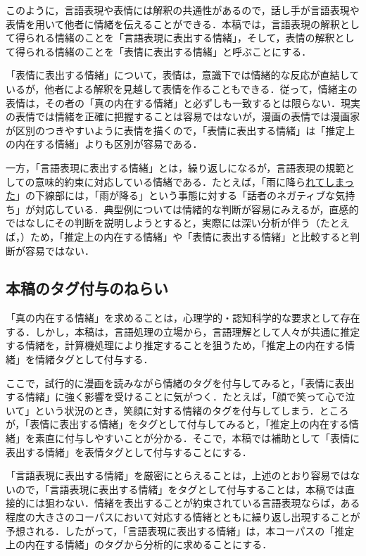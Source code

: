 \documentclass[japanese]{jnlp_1.3c}
\begin{document}
このように，言語表現や表情には解釈の共通性があるので，話し手が言語表現や表情を用いて他者に情緒を伝えることができる．本稿では，言語表現の解釈として得られる情緒のことを「言語表現に表出する情緒」，そして，表情の解釈として得られる情緒のことを「表情に表出する情緒」と呼ぶことにする．

「表情に表出する情緒」について，表情は，意識下では情緒的な反応が直結しているが，他者による解釈を見越して表情を作ることもできる．従って，情緒主の表情は，その者の「真の内在する情緒」と必ずしも一致するとは限らない．現実の表情では情緒を正確に把握することは容易ではないが，漫画の表情では漫画家が区別のつきやすいように表情を描くので，「表情に表出する情緒」は「推定上の内在する情緒」よりも区別が容易である．

一方，「言語表現に表出する情緒」とは，繰り返しになるが，言語表現の規範としての意味的約束に対応している情緒である．たとえば，「雨に降ら\underline{れてしまった}」の下線部には，「雨が降る」という事態に対する「話者のネガティブな気持ち」が対応している．典型例については情緒的な判断が容易にみえるが，直感的ではなしにその判断を説明しようとすると，実際には深い分析が伴う（たとえば，\cite{金子06}）ため，「推定上の内在する情緒」や「表情に表出する情緒」と比較すると判断が容易ではない．

\subsection{本稿のタグ付与のねらい}

「真の内在する情緒」を求めることは，心理学的・認知科学的な要求として存在する．しかし，本稿は，言語処理の立場から，言語理解として人々が共通に推定する情緒を，計算機処理により推定することを狙うため，「推定上の内在する情緒」を情緒タグとして付与する．

ここで，試行的に漫画を読みながら情緒のタグを付与してみると，「表情に表出する情緒」に強く影響を受けることに気がつく．たとえば，「顔で笑って心で泣いて」という状況のとき，笑顔に対する情緒のタグを付与してしまう．ところが，「表情に表出する情緒」をタグとして付与してみると，「推定上の内在する情緒」を素直に付与しやすいことが分かる．そこで，本稿では補助として「表情に表出する情緒」を表情タグとして付与することにする．

「言語表現に表出する情緒」を厳密にとらえることは，上述のとおり容易ではないので，「言語表現に表出する情緒」をタグとして付与することは，本稿では直接的には狙わない．情緒を表出することが約束されている言語表現ならば，ある程度の大きさのコーパスにおいて対応する情緒とともに繰り返し出現することが予想される．したがって，「言語表現に表出する情緒」は，本コーパスの「推定上の内在する情緒」のタグから分析的に求めることにする．
\end{document}
